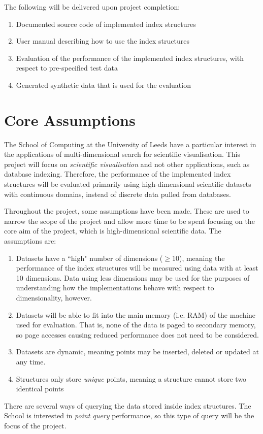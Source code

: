 The following will be delivered upon project completion:
\begin{enumerate}
	\item Documented source code of implemented index structures
	\item User manual describing how to use the index structures
	\item Evaluation of the performance of the implemented index structures, with respect to pre-specified test data
	\item Generated synthetic data that is used for the evaluation
\end{enumerate}

\newpage

\section{Core Assumptions}
\label{sec:core-assumptions}

The School of Computing at the University of Leeds have a particular interest in the applications of multi-dimensional search for scientific visualisation. This project will focus on \textit{scientific visualisation} and not other applications, such as database indexing. Therefore, the performance of the implemented index structures will be evaluated primarily using high-dimensional scientific datasets with continuous domains, instead of discrete data pulled from databases.

Throughout the project, some assumptions have been made. These are used to narrow the scope of the project and allow more time to be spent focusing on the core aim of the project, which is high-dimensional scientific data. The assumptions are:
\begin{enumerate}
	\item Datasets have a ``high" number of dimensions ($\geq 10$), meaning the performance of the index structures will be measured using data with at least 10 dimensions. Data using less dimensions may be used for the purposes of understanding how the implementations behave with respect to dimensionality, however.
	\item Datasets will be able to fit into the main memory (i.e. RAM) of the machine used for evaluation. That is, none of the data is paged to secondary memory, so page accesses causing reduced performance does not need to be considered.
	\item Datasets are dynamic, meaning points may be inserted, deleted or updated at any time.
	\item Structures only store \textit{unique} points, meaning a structure cannot store two identical points
\end{enumerate}

There are several ways of querying the data stored inside index structures. The School is interested in \textit{point query} performance, so this type of query will be the focus of the project.